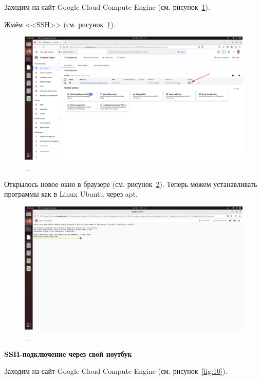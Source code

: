 \documentclass[12pt, a4paper, simple]{eskdtext}
\begin{document}
  Заходим на сайт Google Cloud Compute Engine \cite{GoogleCloudComputeEngine} (см. рисунок~\ref{fig:8}).

  Жмём <<SSH>> (см. рисунок~\ref{fig:8}).

  \begin{figure}[!h]
    \centering
    \includegraphics[width=16cm]
    {images/2023-02-25_20-59-45.png}
    \caption{\_}
    \label{fig:8}
  \end{figure}

  Открылось новое окно в браузере (см. рисунок~\ref{fig:9}). Теперь можем устанавливать программы как в Linux Ubuntu через apt.

  \begin{figure}[!h]
    \centering
    \includegraphics[width=16cm]
    {images/2023-02-25_21-00-38.png}
    \caption{\_}
    \label{fig:9}
  \end{figure}

  \newpage
  \textbf{SSH-подключение через свой ноутбук}

  Заходим на сайт Google Cloud Compute Engine \cite{GoogleCloudComputeEngine} (см. рисунок~\ref{fig:10}).
\end{document}
